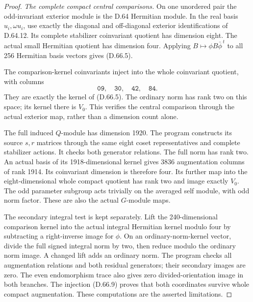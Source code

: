 \begin{proof}
\emph{The complete compact central comparisons.}
On one unordered pair the odd-invariant exterior module is
the D.64 Hermitian module. In the real basis \(u_i,\omega u_i\),
use exactly the diagonal and off-diagonal exterior
identifications of D.64.12. Its complete stabilizer
coinvariant quotient has dimension eight. The actual small
Hermitian quotient has dimension four. Applying
\(B\mapsto\phi B\bar\phi^{\,t}\) to all 256 Hermitian
basis vectors gives (D.66.5).

The comparison-kernel coinvariants inject into the whole
coinvariant quotient, with columns
\[
       \mathtt{09},\quad\mathtt{30},\quad
       \mathtt{42},\quad\mathtt{84}.
 \tag{D.66.9}
\]
They are exactly the kernel of (D.66.5). The ordinary norm
has rank two on this space; its kernel there is \(V_0\).
This verifies the central comparison through the actual
exterior map, rather than a dimension count alone.

The full induced \(Q\)-module has dimension 1920.
The program  constructs
its source \(s,r\) matrices through the same eight coset
representatives and complete stabilizer actions. It checks
both generator relations. The full norm has rank two.
An actual basis of its 1918-dimensional kernel gives 3836
augmentation columns of rank 1914. Its coinvariant
dimension is therefore four. Its further map into the
eight-dimensional whole compact quotient has rank two
and image exactly \(V_0\). The odd parameter subgroup
acts trivially on the averaged self module, with odd norm
factor. These are also the actual \(G\)-module maps.

The secondary integral test is kept separately. Lift the
240-dimensional comparison kernel into the actual integral
Hermitian kernel modulo four by subtracting a right-inverse
image for \(\phi\). On an ordinary-norm-kernel vector,
divide the full signed integral norm by two, then reduce
modulo the ordinary norm image. A changed lift adds an
ordinary norm. The program 
checks all augmentation relations and both residual
generators; their secondary images are zero. The even
endomorphism trace also gives zero divided-orientation
image in both branches. The injection (D.66.9) proves
that both coordinates survive whole compact augmentation.
These computations are the asserted limitations.


\end{proof}
